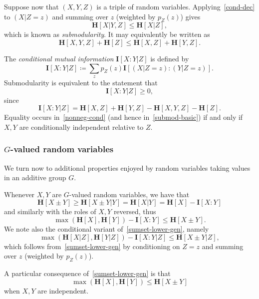 \documentclass[12pt,reqno,tbtags]{amsart}
\theoremstyle{definition}
\theoremstyle{remark}
\renewcommand{\leq}{\leqslant}
\renewcommand{\geq}{\geqslant}
\newcommand{\ent}[1]{\mathbf{H}[#1]}
\newcommand{\I}[1]{\mathbf{I}[#1]}
\numberwithin{equation}{section}
\begin{document}
Suppose now that $(X,Y,Z)$ is a triple of random variables. Applying~\eqref{cond-dec} to $(X | Z = z)$ and summing over $z$ (weighted by $p_Z(z)$) gives
\begin{equation}\label{submodularity-first} \ent{X | Y, Z} \leq \ent{X | Z},\end{equation} which is known as \emph{submodularity}. It may equivalently be written as
\begin{equation}\label{submod-basic}  \ent{X,Y,Z} + \ent{Z} \leq \ent{X,Z} + \ent{Y,Z}.\end{equation}

The \emph{conditional mutual information} $\I{X:Y|Z}$ is defined by
\[
  \I{X:Y|Z} \coloneqq \sum_z p_Z(z) \I{ (X|Z=z) : (Y|Z=z)}.
\]
Submodularity is equivalent to the statement that
\begin{equation}
  \label{nonneg-cond}
  \I{X:Y|Z} \geq 0,
\end{equation}
since
\begin{equation}\label{cond-form-mutual-2}  \I{X:Y|Z} = \ent{X,Z} + \ent{Y,Z} - \ent{X,Y,Z} - \ent{Z}.\end{equation}
Equality occurs in~\eqref{nonneg-cond} (and hence in~\eqref{submod-basic}) if and only if $X,Y$ are conditionally independent relative to $Z$.

\subsubsection*{$G$-valued random variables}
We turn now to additional properties enjoyed by random variables taking values in an additive group $G$.

Whenever $X,Y$ are $G$-valued random variables, we have
that
\[
  \ent{X\pm Y} \geq \ent{X\pm Y|Y} = \ent{X|Y} = \ent{X} - \I{X:Y}
\]
and similarly with the roles of $X,Y$ reversed, thus
\begin{equation}
  \label{sumset-lower-gen}
  \max(\ent{X}, \ent{Y}) - \I{X:Y} \leq \ent{X\pm Y}.
\end{equation}
We note also the conditional variant of~\eqref{sumset-lower-gen}, namely
\[
  \max(\ent{X|Z}, \ent{Y|Z}) - \I{X:Y|Z} \leq \ent{X\pm Y|Z},
\]
which follows from~\eqref{sumset-lower-gen} by conditioning on $Z = z$ and summing over $z$ (weighted by $p_Z(z)$).

A particular consequence of~\eqref{sumset-lower-gen} is that
\begin{equation}
  \label{sumset-lower}
  \max(\ent{X}, \ent{Y}) \leq \ent{X\pm Y}
\end{equation}
when $X,Y$ are independent.
\end{document}
